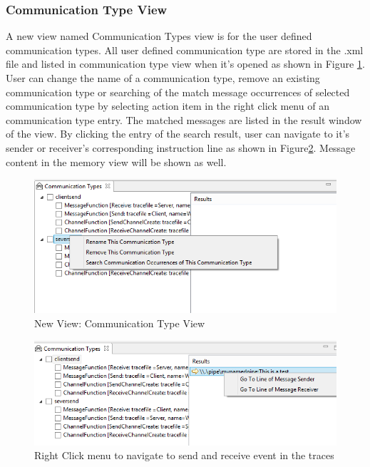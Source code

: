 \subsubsection{Communication Type View}
A new view named Communication Types view is for the user defined communication types. All user defined communication type are stored in the .xml file and listed in communication type view when it's opened as shown in Figure \ref{CommunicationTypeview}. User can change the name of a communication type, remove an existing communication type or searching of the match message occurrences of selected communication type by selecting action item in the right click menu of an communication type entry. The matched messages are listed in the result window of the view. By clicking the entry of the search  result, user can navigate to it's sender or receiver's corresponding instruction line as shown in Figure\ref{searchresult}. Message content in the memory view will be shown as well.


\begin{figure}[h]
\includegraphics[scale=.9]{Figures/CommunicationTypeview}
 \caption{New View: Communication Type View}
\label{CommunicationTypeview}
\end{figure}

\begin{figure}[h]
\includegraphics[scale=.9]{Figures/searchresult}
 \caption{Right Click menu to navigate to send and receive event in the traces}
\label{searchresult}
\end{figure}

